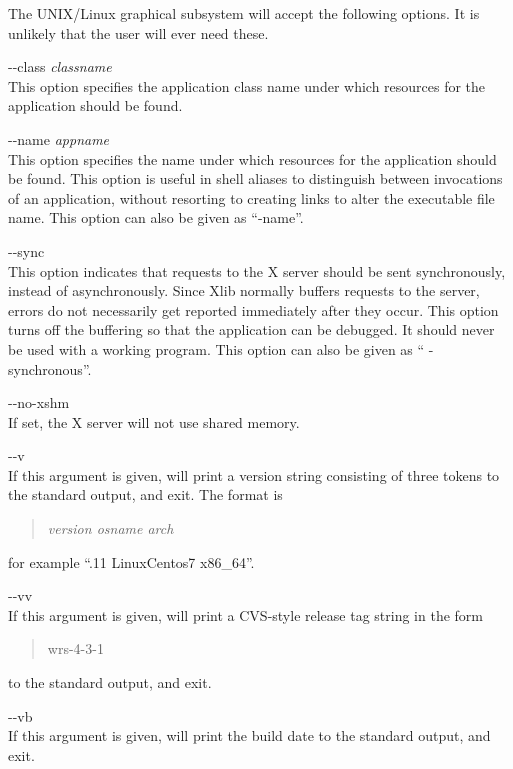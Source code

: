 The UNIX/Linux graphical subsystem will accept the following options. 
It is unlikely that the user will ever need these.

\begin{description}
\item{\vt -\/-class} {\it classname}\\
This option specifies the application class name under which resources
for the application should be found.

\item{\vt -\/-name} {\it appname}\\
This option specifies the name under which resources for the
application should be found.  This option is useful in shell aliases
to distinguish between invocations of an application, without
resorting to creating links to alter the executable file name.
This option can also be given as ``{\vt -name}''.

\item{\vt -\/-sync}\\
This option indicates that requests to the X server should be sent
synchronously, instead of asynchronously.  Since Xlib normally buffers
requests to the server, errors do not necessarily get reported
immediately after they occur.  This option turns off the buffering so
that the application can be debugged.  It should never be used with a
working program.  This option can also be given as ``{\vt
-synchronous}''.

\item{\vt -\/-no-xshm}\\
If set, the X server will not use shared memory.

\item{\vt -\/-v}\\
If this argument is given, {\WRspice} will print a version string
consisting of three tokens to the standard output, and exit.  The
format is
\begin{quote}
{\it version osname arch}
\end{quote}
for example ``{.11 LinuxCentos7 x86\_64}''.

\item{\vt -\/-vv}\\
If this argument is given, {\WRspice} will print a CVS-style release
tag string in the form
\begin{quote}
{\vt wrs-4-3-1}
\end{quote}
to the standard output, and exit.

\item{\vt -\/-vb}\\
If this argument is given, {\WRspice} will print the build date to the
standard output, and exit.
\end{description}


